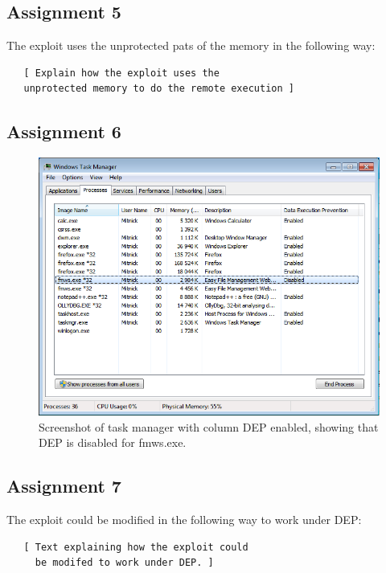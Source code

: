 \documentclass[10pt]{article}
\begin{document}

    \subsection{Assignment 5}

      The exploit uses the unprotected pats of the memory in the following way:

      \begin{verbatim}
   [ Explain how the exploit uses the
   unprotected memory to do the remote execution ]
      \end{verbatim}

    \subsection{Assignment 6}


 \begin{figure}
	\caption{Screenshot of task manager with column DEP enabled, showing that DEP is disabled for fmws.exe.}\vspace{0.2em}
	\label{DEP}
	\includegraphics[width=\textwidth]{DEPdisabled-fmws.png}
\end{figure}


    \subsection{Assignment 7}

      The exploit could be modified in the following way to work under DEP:

      \begin{verbatim}
   [ Text explaining how the exploit could
     be modifed to work under DEP. ]
      \end{verbatim}
\end{document}
